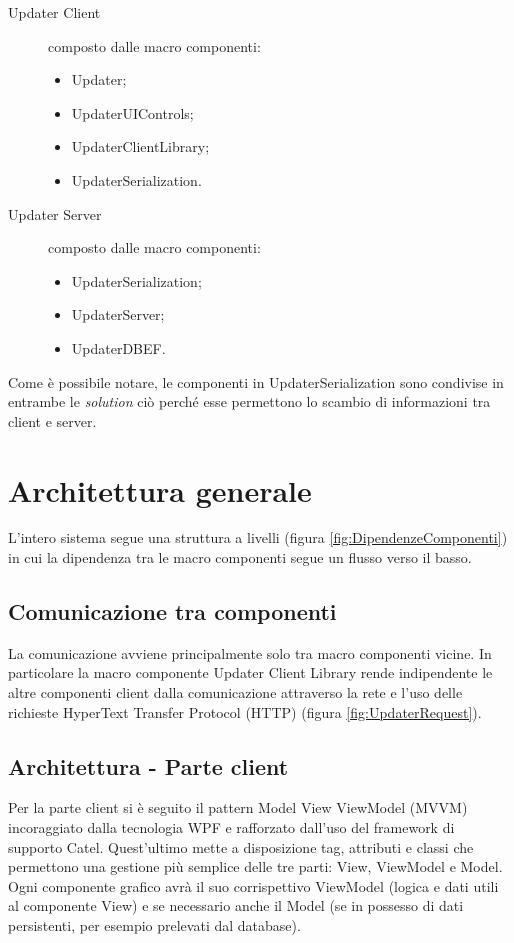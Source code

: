 \documentclass[../RelazioneFinale.tex]{subfiles}
\begin{document}
 			\begin{description}
 				\item[Updater Client] composto dalle macro componenti:
 				
 				\begin{itemize}
 					\item Updater;
 					\item UpdaterUIControls;
 					\item UpdaterClientLibrary;
 					\item UpdaterSerialization.
 				\end{itemize}
 				\item[Updater Server] composto dalle macro componenti:
 				
 				\begin{itemize}
 					\item UpdaterSerialization;
 					\item UpdaterServer;
 					\item UpdaterDBEF.
 				\end{itemize}
 			\end{description}
 			Come è possibile notare, le componenti in UpdaterSerialization sono condivise in entrambe le \emph{solution} ciò perché esse permettono lo scambio di informazioni tra client e server.
 			
		
		\section{Architettura generale}
			L'intero sistema segue una struttura a livelli (figura \ref{fig:DipendenzeComponenti}) in cui la dipendenza tra le macro componenti segue un flusso verso il basso.
			
			\subsection*{Comunicazione tra componenti}
			La comunicazione avviene principalmente solo tra macro componenti vicine. In particolare la macro componente Updater Client Library rende indipendente le altre componenti client dalla comunicazione attraverso la rete e l'uso delle richieste HyperText Transfer Protocol (HTTP) (figura \ref{fig:UpdaterRequest}). 
			
			\subsection*{Architettura - Parte client}
			Per la parte client si è seguito il pattern Model View ViewModel (MVVM) incoraggiato dalla tecnologia WPF e rafforzato dall'uso del framework di supporto Catel. Quest'ultimo mette a disposizione tag, attributi e classi che permettono una gestione più semplice delle tre parti: View, ViewModel e Model.
			Ogni componente grafico avrà il suo corrispettivo ViewModel (logica e dati utili al componente View) e se necessario anche il Model (se in possesso di dati persistenti, per esempio prelevati dal database).
			
\end{document}
